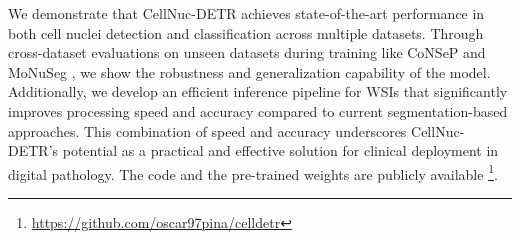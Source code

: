 We demonstrate that CellNuc-DETR achieves state-of-the-art performance in both cell nuclei detection and classification across multiple datasets. Through cross-dataset evaluations on unseen datasets during training like CoNSeP \cite{graham2019hover} and MoNuSeg \cite{kumar2019multi}, we show the robustness and generalization capability of the model. Additionally, we develop an efficient inference pipeline for WSIs that significantly improves processing speed and accuracy compared to current segmentation-based approaches. This combination of speed and accuracy underscores CellNuc-DETR's potential as a practical and effective solution for clinical deployment in digital pathology. The code and the pre-trained weights are publicly available \footnote{\href{https://github.com/oscar97pina/celldetr}{https://github.com/oscar97pina/celldetr}}.
